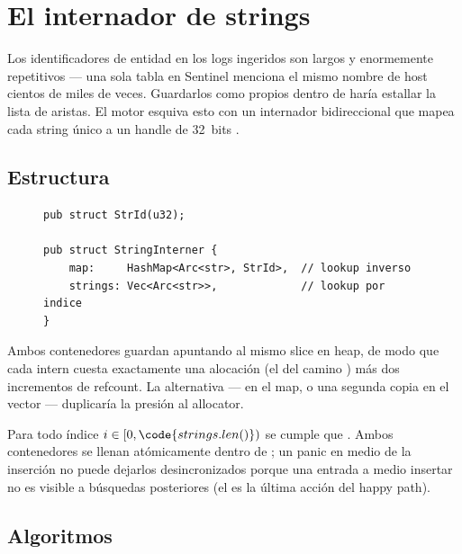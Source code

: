 \chapter{El internador de strings}
\label{ch:interner}

Los identificadores de entidad en los logs ingeridos son largos y
enormemente repetitivos --- una sola tabla  en
Sentinel menciona el mismo nombre de host cientos de miles de
veces. Guardarlos como  propios dentro de
 haría estallar la lista de aristas. El
motor esquiva esto con un internador bidireccional que mapea cada
string único a un handle de 32~bits \StrId{}.

\section{Estructura}

\begin{figure}[h]
\centering
\begin{lstlisting}[style=rust]
pub struct StrId(u32);

pub struct StringInterner {
    map:     HashMap<Arc<str>, StrId>,  // lookup inverso
    strings: Vec<Arc<str>>,             // lookup por indice
}
\end{lstlisting}
\end{figure}

Ambos contenedores guardan  apuntando al mismo
slice en heap, de modo que cada intern cuesta exactamente una
alocación (el  del camino )
más dos incrementos de refcount. La alternativa --- 
en el map,  o una segunda copia en el vector ---
duplicaría la presión al allocator.

\begin{invariant}
Para todo índice $i \in [0, \code{strings.len()})$ se cumple que
. Ambos contenedores se
llenan atómicamente dentro de ; un panic en medio de
la inserción no puede dejarlos desincronizados porque una entrada
a medio insertar no es visible a búsquedas posteriores (el
 es la última acción del happy path).
\end{invariant}

\section{Algoritmos}


